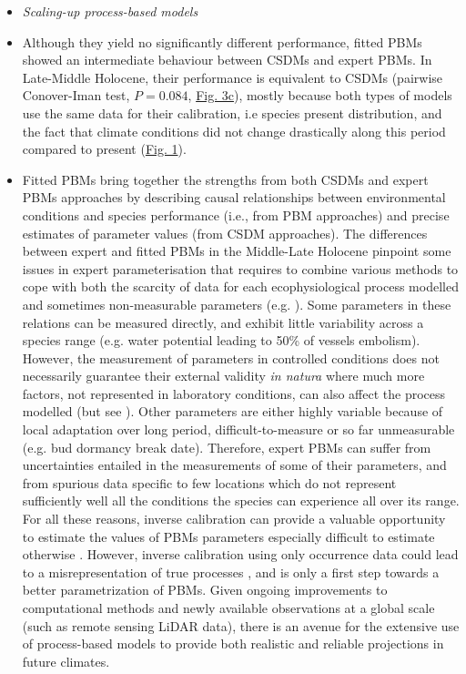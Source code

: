 \documentclass[pdflatex, sn-nature]{sn-jnl}%
\begin{document}
\begin{itemize}
\item \emph{Scaling-up process-based models}\par
\item Although they yield no significantly different performance, fitted PBMs showed an intermediate behaviour between CSDMs and expert PBMs. In Late-Middle Holocene, their performance is equivalent to CSDMs (pairwise Conover-Iman test, $P=0.084$, \hyperref[past_performance]{Fig. 3c}), mostly because both types of models use the same data for their calibration, i.e species present distribution, and the fact that climate conditions did not change drastically along this period compared to present (\hyperref[climatic_dissimilarity]{Fig. 1}).  
\item Fitted PBMs bring together the strengths from both CSDMs and expert PBMs approaches by describing causal relationships between environmental conditions and species performance (i.e., from PBM approaches) and precise estimates of parameter values (from CSDM approaches). The differences between expert and fitted PBMs in the Middle-Late Holocene pinpoint some issues in expert parameterisation that requires to combine various methods to cope with both the scarcity of data for each ecophysiological process modelled and sometimes non-measurable parameters (e.g. \citep{DeCaceres2023}).  Some parameters in these relations can be measured directly, and exhibit little variability across a species range (e.g. water potential leading to 50\% of vessels embolism). However, the measurement of parameters in controlled conditions does not necessarily guarantee their external validity \emph{in natura} \cite{Asse2020} where much more factors, not represented in laboratory conditions, can also affect the process modelled (but see \cite{Satake2013}). Other parameters are either highly variable because of local adaptation over long period,  difficult-to-measure or so far unmeasurable (e.g. bud dormancy break date). Therefore, expert PBMs can suffer from uncertainties entailed in the measurements of some of their parameters, and from spurious data specific to few locations which do not represent sufficiently well all the conditions the species can experience all over its range. For all these reasons, inverse calibration can provide a valuable opportunity to estimate the values of PBMs parameters especially difficult to estimate otherwise \cite{Evans2016}. However, inverse calibration using only occurrence data could lead to a misrepresentation of true processes \cite{VanderMeersch2023}, and is only a first step towards a better parametrization of PBMs. Given ongoing improvements to computational methods and newly available observations at a global scale (such as remote sensing LiDAR data), there is an avenue for the extensive use of process-based models to provide both realistic and reliable projections in future climates.


\end{itemize}
\end{document}
